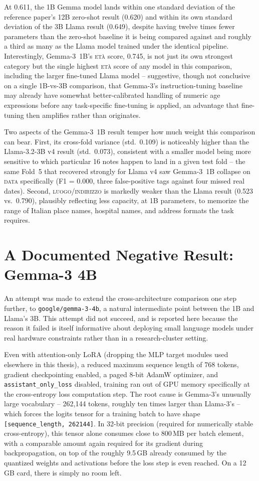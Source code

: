 \documentclass[12pt,a4paper]{report}
\newcommand{\ETA}{\textsc{et\`a}}
\newcommand{\DATA}{\textsc{data}}
\newcommand{\LUOGO}{\textsc{luogo\slash indirizzo}}
\begin{document}
At 0.611, the 1B Gemma model lands within one standard deviation of the reference paper's 12B zero-shot result (0.620) and within its own standard deviation of the 3B Llama result (0.649), despite having twelve times fewer parameters than the zero-shot baseline it is being compared against and roughly a third as many as the Llama model trained under the identical pipeline. Interestingly, Gemma-3~1B's \ETA{} score, 0.745, is not just its own strongest category but the single highest \ETA{} score of any model in this comparison, including the larger fine-tuned Llama model -- suggestive, though not conclusive on a single 1B-vs-3B comparison, that Gemma-3's instruction-tuning baseline may already have somewhat better-calibrated handling of numeric age expressions before any task-specific fine-tuning is applied, an advantage that fine-tuning then amplifies rather than originates.

Two aspects of the Gemma-3~1B result temper how much weight this comparison can bear. First, its cross-fold variance (std.\ 0.109) is noticeably higher than the Llama-3.2-3B v4 result (std.\ 0.073), consistent with a smaller model being more sensitive to which particular 16 notes happen to land in a given test fold -- the same Fold~5 that recovered strongly for Llama v4 saw Gemma-3~1B collapse on \DATA{} specifically (F1 = 0.000, three false-positive tags against four missed real dates). Second, \LUOGO{} is markedly weaker than the Llama result (0.523 vs.\ 0.790), plausibly reflecting less capacity, at 1B parameters, to memorize the range of Italian place names, hospital names, and address formats the task requires.

\section{A Documented Negative Result: Gemma-3 4B}
\label{sec:gemma4b-oom}

An attempt was made to extend the cross-architecture comparison one step further, to \texttt{google/gemma-3-4b}, a natural intermediate point between the 1B and Llama's 3B. This attempt did not succeed, and is reported here because the reason it failed is itself informative about deploying small language models under real hardware constraints rather than in a research-cluster setting.

Even with attention-only LoRA (dropping the MLP target modules used elsewhere in this thesis), a reduced maximum sequence length of 768 tokens, gradient checkpointing enabled, a paged 8-bit AdamW optimizer, and \texttt{assistant\_only\_loss} disabled, training ran out of GPU memory specifically at the cross-entropy loss computation step. The root cause is Gemma-3's unusually large vocabulary -- 262,144 tokens, roughly ten times larger than Llama-3's -- which forces the logits tensor for a training batch to have shape \texttt{[sequence\_length, 262144]}. In 32-bit precision (required for numerically stable cross-entropy), this tensor alone consumes close to 800\,MB per batch element, with a comparable amount again required for its gradient during backpropagation, on top of the roughly 9.5\,GB already consumed by the quantized weights and activations before the loss step is even reached. On a 12\,GB card, there is simply no room left.
\end{document}
